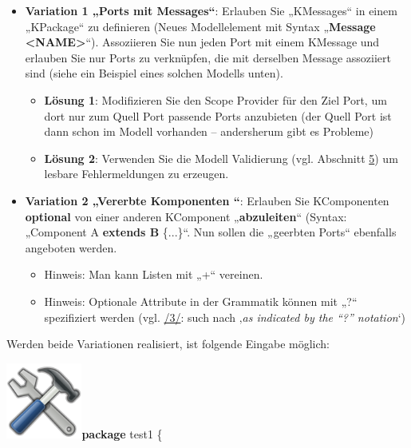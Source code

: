 \documentclass[]{article}
\providecommand{\tightlist}{%
  \setlength{\itemsep}{0pt}\setlength{\parskip}{0pt}}
\begin{document}
\begin{itemize}
\item
  \textbf{Variation 1 „Ports mit Messages``}: Erlauben Sie „KMessages``
  in einem „KPackage`` zu definieren (Neues Modellelement mit Syntax
  „\textbf{Message \textless{}NAME\textgreater{}}``). Assoziieren Sie
  nun jeden Port mit einem KMessage und erlauben Sie nur Ports zu
  verknüpfen, die mit derselben Message assoziiert sind (siehe ein
  Beispiel eines solchen Modells unten).

  \begin{itemize}
  \tightlist
  \item
    \textbf{Lösung 1}: Modifizieren Sie den Scope Provider für den Ziel
    Port, um dort nur zum Quell Port passende Ports anzubieten (der
    Quell Port ist dann schon im Modell vorhanden -- andersherum gibt es
    Probleme)
  \item
    \textbf{Lösung 2}: Verwenden Sie die Modell Validierung (vgl.
    Abschnitt \protect\hyperlink{anchor-28}{5}) um lesbare
    Fehlermeldungen zu erzeugen.
  \end{itemize}
\item
  \textbf{Variation 2 „Vererbte Komponenten ``}: Erlauben Sie
  KComponenten \textbf{optional }von einer anderen KComponent
  „\textbf{abzuleiten}`` (Syntax: „Component A \textbf{extends B}
  \{...\}``. Nun sollen die „geerbten Ports`` ebenfalls angeboten
  werden.

  \begin{itemize}
  \tightlist
  \item
    Hinweis: Man kann Listen mit „+`` vereinen.
  \item
    Hinweis: Optionale Attribute in der Grammatik können mit „?``
    spezifiziert werden (vgl. \protect\hyperlink{anchor-3}{/3/}: such
    nach ‚\emph{as indicated by the ``?'' notation}`)
  \end{itemize}
\end{itemize}

Werden beide Variationen realisiert, ist folgende Eingabe möglich:

\includegraphics[width=0.98350in,height=0.98350in]{./Pictures/1000020100000080000000807EA91CDFA7B7F397.png}\textbf{package}
test1 \{
\end{document}
